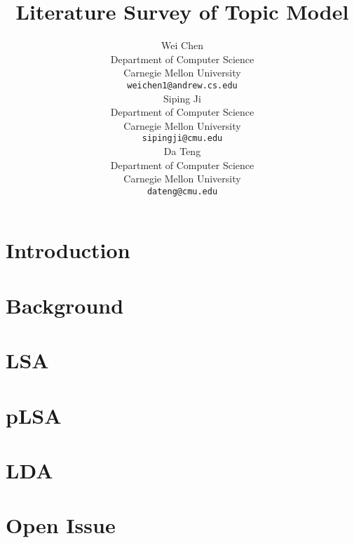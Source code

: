 \documentclass{article} %
\title{Literature Survey of Topic Model}
\author{
Wei Chen \\
Department of Computer Science\\
Carnegie Mellon University\\
\texttt{weichen1@andrew.cs.edu} \\
\And
Siping Ji\\
Department of Computer Science\\
Carnegie Mellon University\\
\texttt{sipingji@cmu.edu} \\
\AND
Da Teng \\
Department of Computer Science\\
Carnegie Mellon University\\
\texttt{dateng@cmu.edu} \\
}
\begin{document}
\maketitle

\tableofcontents

\newpage
\section{Introduction}
    \label{sec:intro}
    
    
\section{Background}
    \label{sec:background}
    
    
\section{LSA}
    \label{sec:lsa}
    

\section{pLSA}
    \label{sec:plsa}
    

\section{LDA}
    \label{sec:lda}
    

\section{Open Issue}
    \label{sec:issue}
    



%
%
%



\end{document}
